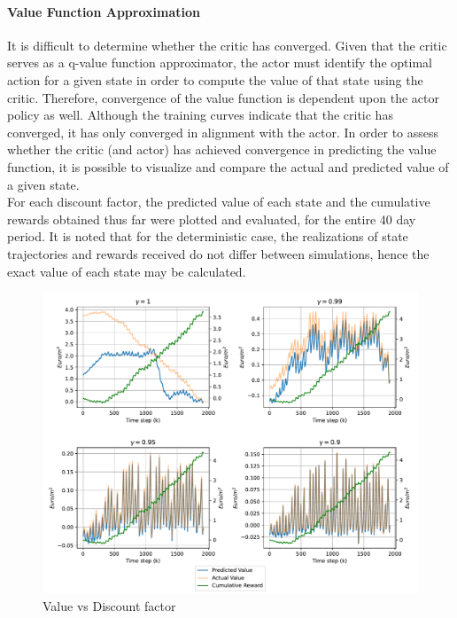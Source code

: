 \paragraph{Value Function Approximation}
It is difficult to determine whether the critic has converged. Given that the critic serves as a q-value function approximator, the actor must identify the optimal action for a given state in order to compute the value of that state using the critic. Therefore, convergence of the value function is dependent upon the actor policy as well. Although the training curves indicate that the critic has converged, it has only converged in alignment with the actor. In order to assess whether the critic (and actor) has achieved convergence in predicting the value function, it is possible to visualize and compare the actual and predicted value of a given state.\\
For each discount factor, the predicted value of each state and the cumulative rewards obtained thus far were plotted and evaluated, for the entire 40 day period. It is noted that for the deterministic case, the realizations of state trajectories and rewards received do not differ between simulations, hence the exact value of each state may be calculated. 


\begin{figure}[H]
    \centering
    \includegraphics[width = \textwidth]{figures/vf_vs_gamma.pdf}
    \caption{Value vs Discount factor}
    \label{fig:vf-vs-gamma}
\end{figure}

